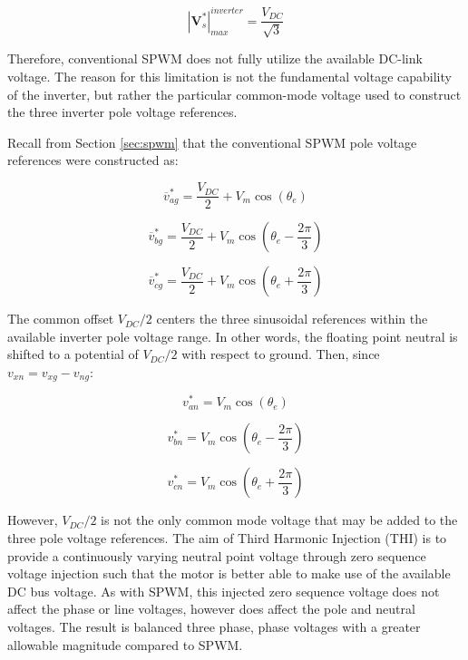 \documentclass{article}
\begin{document}
\begin{equation}
    |\mathbf{V}_s^*|_{max}^{inverter} = \frac{V_{DC}}{\sqrt{3}}
\end{equation}

Therefore, conventional SPWM does not fully utilize the available DC-link voltage. The reason for this limitation is not the fundamental voltage capability of the inverter, but rather the particular common-mode voltage used to construct the three inverter pole voltage references.

Recall from Section \ref{sec:spwm} that the conventional SPWM pole voltage references were constructed as:

\begin{equation}
    \overline{v}_{ag}^* = \frac{V_{DC}}{2} + V_m\cos(\theta_e)
\end{equation}

\begin{equation}
    \overline{v}_{bg}^* = \frac{V_{DC}}{2} + V_m\cos(\theta_e - \frac{2\pi}{3})
\end{equation}

\begin{equation}
    \overline{v}_{cg}^* = \frac{V_{DC}}{2} + V_m\cos(\theta_e + \frac{2\pi}{3})
\end{equation}

The common offset $V_{DC}/2$ centers the three sinusoidal references within the available inverter pole voltage range. In other words, the floating point neutral is shifted to a potential of $V_{DC}/2$ with respect to ground. Then, since $v_{xn} = v_{xg} - v_{ng}$:

\begin{equation}
    v_{an}^* = V_m\cos(\theta_e)
\end{equation}

\begin{equation}
    v_{bn}^* = V_m\cos(\theta_e - \frac{2\pi}{3})
\end{equation}

\begin{equation}
    v_{cn}^* = V_m\cos(\theta_e + \frac{2\pi}{3})
\end{equation}

However, $V_{DC}/2$ is not the only common mode voltage that may be added to the three pole voltage references. The aim of Third Harmonic Injection (THI) is to provide a continuously varying neutral point voltage through zero sequence voltage injection such that the motor is better able to make use of the available DC bus voltage. As with SPWM, this injected zero sequence voltage does not affect the phase or line voltages, however does affect the pole and neutral voltages. The result is balanced three phase, phase voltages with a greater allowable magnitude compared to SPWM.
\end{document}
